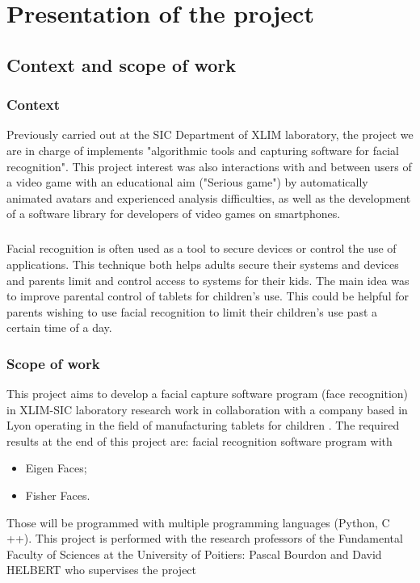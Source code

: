 \chapter{Presentation of the project}


\section{Context and scope of work}
\subsection{Context}
Previously carried out at the SIC Department of XLIM laboratory, the project we are in charge of implements "algorithmic tools and capturing software for facial recognition". This project interest was also interactions with and between users of a video game with an educational aim ("Serious game") by automatically animated avatars and experienced analysis difficulties, as well as the development of a software library for developers of video games on smartphones.
\paragraph{}
Facial recognition is often used as a tool to secure devices or control the use of applications. This technique both helps adults secure their systems and devices and parents limit and control access to systems for their kids.
The main idea was to improve parental control of tablets for children’s use. This could be helpful for parents wishing to use facial recognition to limit their children’s use past a certain time of a day.
\subsection{Scope of work}
This project aims to develop a facial capture software program (face recognition) in XLIM-SIC laboratory research work in collaboration with a company based in Lyon operating in the field of manufacturing tablets for children .
The required results at the end of this project are: facial recognition software program with
\begin{itemize}
\item Eigen Faces;
\item Fisher Faces.
\end{itemize}
Those will be programmed with multiple programming languages (Python, C ++).
This project is performed with the research professors of the Fundamental Faculty of  Sciences at the University of Poitiers: Pascal Bourdon and David HELBERT who  supervises the project


